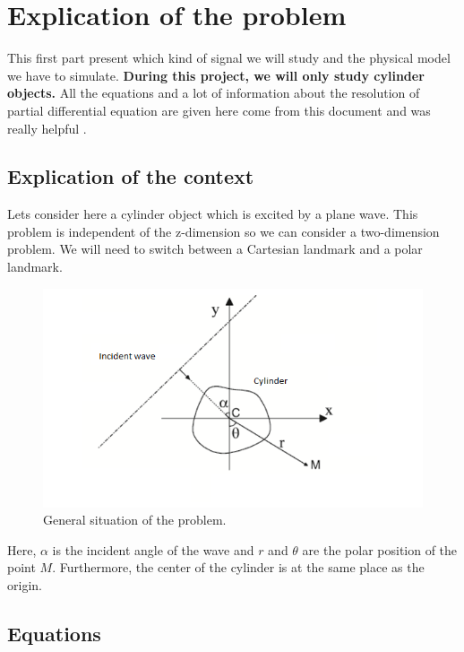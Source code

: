 


\chapter{Explication of the problem}

\medskip
This first part present which kind of signal we will study and the physical model we have to simulate. \textbf{During this project, we will only study cylinder objects.} All the equations and a lot of information about the resolution of partial differential equation are given here come from this document \cite{EDP} and was really helpful .

\medskip

\section{Explication of the context}

Lets consider here a cylinder object which is excited by a plane wave. This problem is independent of the z-dimension so we can consider a two-dimension problem.
We will need to switch between a Cartesian landmark and a polar landmark.
\begin{figure}[H]
\centering
    \includegraphics[scale=1,angle=0]{Images/Image2.PNG}
    \caption{General situation of the problem.}
    \label{fig:Image2}
\end{figure}

Here, $\alpha$ is the incident angle of the wave and $r$ and $\theta$ are the polar position of the point $M$. Furthermore, the center of the cylinder is at the same place as the origin. 

\section{Equations}


